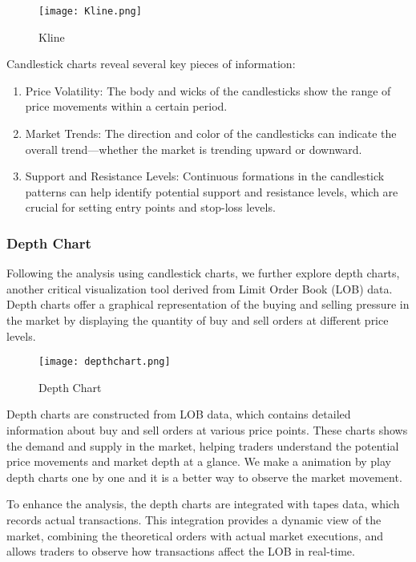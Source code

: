 \documentclass[conference]{IEEEtran}
\begin{document}
\begin{figure}[tb]
    \centerline{\texttt{[image: Kline.png]}}
    \caption{Kline}
    \label{Kline.png}
\end{figure}


Candlestick charts reveal several key pieces of information:
\begin{enumerate}    
  \item Price Volatility: The body and wicks of the candlesticks show the range of price movements within a certain period.
  \item Market Trends: The direction and color of the candlesticks can indicate the overall trend—whether the market is trending upward or downward.
  \item Support and Resistance Levels: Continuous formations in the candlestick patterns can help identify potential support and resistance levels, which are crucial for setting entry points and stop-loss levels.

\end{enumerate}



\subsubsection{Depth Chart}

Following the analysis using candlestick charts, we further explore depth charts, another critical visualization tool derived from Limit Order Book (LOB) data. Depth charts offer a graphical representation of the buying and selling pressure in the market by displaying the quantity of buy and sell orders at different price levels.
\begin{figure}[tb]
    \centerline{\texttt{[image: depthchart.png]}}
    \caption{Depth Chart}
    \label{depthchart}
\end{figure}
Depth charts are constructed from LOB data, which contains detailed information about buy and sell orders at various price points. These charts shows the demand and supply in the market, helping traders understand the potential price movements and market depth at a glance. We
make a animation by play depth charts one by one and it is a better way to observe the market movement.

To enhance the analysis, the depth charts are integrated with tapes data, which records actual transactions. This integration provides a dynamic view of the market, combining the theoretical orders with actual market executions, and allows traders to observe how transactions affect the LOB in real-time.
\end{document}
